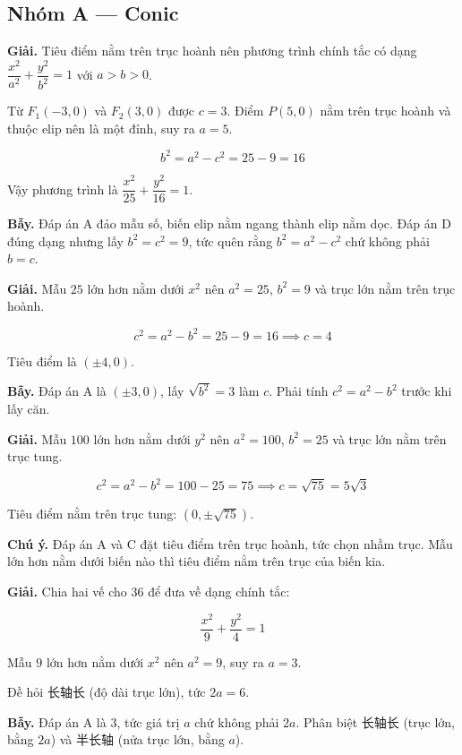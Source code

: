 \documentclass[11pt, a4paper]{article}
\begin{document}

\subsection*{Nhóm A — Conic}

\begin{dapan}[1 — Đáp án B]
\textbf{Giải.} Tiêu điểm nằm trên trục hoành nên phương trình chính tắc có dạng $\dfrac{x^2}{a^2} + \dfrac{y^2}{b^2} = 1$ với $a > b > 0$.

Từ $F_1(-3, 0)$ và $F_2(3, 0)$ được $c = 3$. Điểm $P(5, 0)$ nằm trên trục hoành và thuộc elip nên là một đỉnh, suy ra $a = 5$.

$$b^2 = a^2 - c^2 = 25 - 9 = 16$$

Vậy phương trình là $\dfrac{x^2}{25} + \dfrac{y^2}{16} = 1$.

\textbf{Bẫy.} Đáp án A đảo mẫu số, biến elip nằm ngang thành elip nằm dọc. Đáp án D đúng dạng nhưng lấy $b^2 = c^2 = 9$, tức quên rằng $b^2 = a^2 - c^2$ chứ không phải $b = c$.
\end{dapan}

\begin{dapan}[2 — Đáp án C]
\textbf{Giải.} Mẫu $25$ lớn hơn nằm dưới $x^2$ nên $a^2 = 25$, $b^2 = 9$ và trục lớn nằm trên trục hoành.

$$c^2 = a^2 - b^2 = 25 - 9 = 16 \implies c = 4$$

Tiêu điểm là $(\pm 4, 0)$.

\textbf{Bẫy.} Đáp án A là $(\pm 3, 0)$, lấy $\sqrt{b^2} = 3$ làm $c$. Phải tính $c^2 = a^2 - b^2$ trước khi lấy căn.
\end{dapan}

\begin{dapan}[3 — Đáp án D]
\textbf{Giải.} Mẫu $100$ lớn hơn nằm dưới $y^2$ nên $a^2 = 100$, $b^2 = 25$ và trục lớn nằm trên trục tung.

$$c^2 = a^2 - b^2 = 100 - 25 = 75 \implies c = \sqrt{75} = 5\sqrt{3}$$

Tiêu điểm nằm trên trục tung: $(0, \pm\sqrt{75})$.

\textbf{Chú ý.} Đáp án A và C đặt tiêu điểm trên trục hoành, tức chọn nhầm trục. Mẫu lớn hơn nằm dưới biến nào thì tiêu điểm nằm trên trục của biến kia.
\end{dapan}

\begin{dapan}[4 — Đáp án C]
\textbf{Giải.} Chia hai vế cho $36$ để đưa về dạng chính tắc:

$$\frac{x^2}{9} + \frac{y^2}{4} = 1$$

Mẫu $9$ lớn hơn nằm dưới $x^2$ nên $a^2 = 9$, suy ra $a = 3$.

Đề hỏi 长轴长 (độ dài trục lớn), tức $2a = 6$.

\textbf{Bẫy.} Đáp án A là $3$, tức giá trị $a$ chứ không phải $2a$. Phân biệt 长轴长 (trục lớn, bằng $2a$) và 半长轴 (nửa trục lớn, bằng $a$).
\end{dapan}
\end{document}
